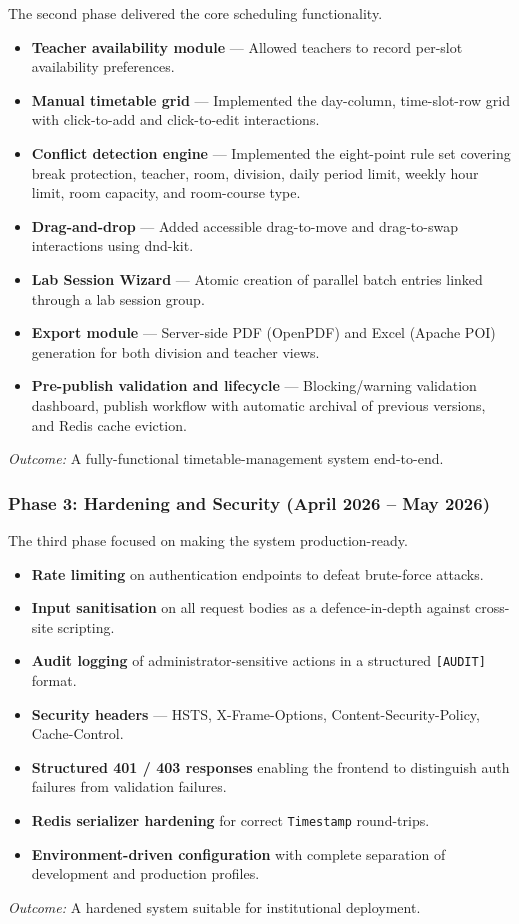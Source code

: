 The second phase delivered the core scheduling functionality.
\begin{itemize}
    \item \textbf{Teacher availability module} --- Allowed teachers to record per-slot availability preferences.
    \item \textbf{Manual timetable grid} --- Implemented the day-column, time-slot-row grid with click-to-add and click-to-edit interactions.
    \item \textbf{Conflict detection engine} --- Implemented the eight-point rule set covering break protection, teacher, room, division, daily period limit, weekly hour limit, room capacity, and room-course type.
    \item \textbf{Drag-and-drop} --- Added accessible drag-to-move and drag-to-swap interactions using dnd-kit.
    \item \textbf{Lab Session Wizard} --- Atomic creation of parallel batch entries linked through a lab session group.
    \item \textbf{Export module} --- Server-side PDF (OpenPDF) and Excel (Apache POI) generation for both division and teacher views.
    \item \textbf{Pre-publish validation and lifecycle} --- Blocking/warning validation dashboard, publish workflow with automatic archival of previous versions, and Redis cache eviction.
\end{itemize}
\textit{Outcome:} A fully-functional timetable-management system end-to-end.

\subsubsection{Phase 3: Hardening and Security (April 2026 -- May 2026)}

The third phase focused on making the system production-ready.
\begin{itemize}
    \item \textbf{Rate limiting} on authentication endpoints to defeat brute-force attacks.
    \item \textbf{Input sanitisation} on all request bodies as a defence-in-depth against cross-site scripting.
    \item \textbf{Audit logging} of administrator-sensitive actions in a structured \texttt{[AUDIT]} format.
    \item \textbf{Security headers} --- HSTS, X-Frame-Options, Content-Security-Policy, Cache-Control.
    \item \textbf{Structured 401 / 403 responses} enabling the frontend to distinguish auth failures from validation failures.
    \item \textbf{Redis serializer hardening} for correct \texttt{Timestamp} round-trips.
    \item \textbf{Environment-driven configuration} with complete separation of development and production profiles.
\end{itemize}
\textit{Outcome:} A hardened system suitable for institutional deployment.

